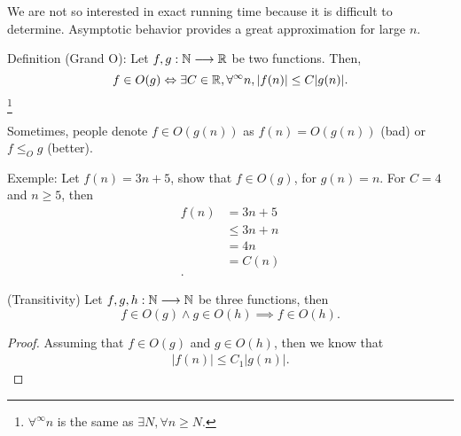 We are not so interested in exact running time because it is difficult to determine.
Asymptotic behavior provides a great approximation for large $n$.

Definition (Grand O): Let $f,g: \mathbb{N} \longrightarrow \mathbb{R}$ be two functions. Then, \[
f\in O(g) \Leftrightarrow \exists C\in \mathbb{R}, \forall^{\infty}n, |f(n)| \le C|g(n)|
.\]\footnote{$\forall^{\infty}n$ is the same as $\exists N, \forall n\ge N$.}

Sometimes, people denote $f\in O(g(n))$ as $f(n) = O(g(n))$ (bad) or $f\le_{O} g$ (better).

Exemple: Let $f(n) = 3n+5$, show that $f\in O(g)$, for $g(n)=n$.
For $C=4$ and $n\ge 5$, then
\begin{align*}
    f(n) &= 3n+5 \\
    &\le 3n+n  \\
    &= 4n \\
    &= C(n) \\
.\end{align*}

\begin{lemma}
    (Transitivity) Let $f,g,h: \mathbb{N} \longrightarrow \mathbb{N}$ be three functions, then \[
    f\in O(g) \land g\in O(h) \implies f \in O(h)
    .\]
\end{lemma}
\begin{proof}
    Assuming that $f\in O(g)$ and $g\in O(h)$, then we know that
    \begin{align*}
        |f(n)| \le C_1 |g(n)|
    .\end{align*}
\end{proof}


